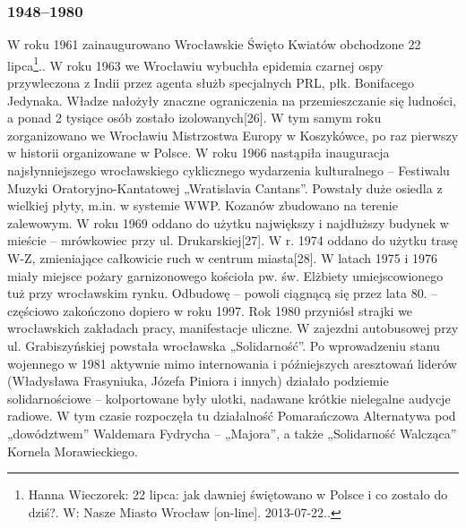 \documentclass{article}
\begin{document}
\subsubsection{1948–1980}
\vspace{3mm} %
\newline W roku 1961 zainaugurowano Wrocławskie Święto Kwiatów obchodzone 22 lipca\footnote{Hanna Wieczorek: 22 lipca: jak dawniej świętowano w Polsce i co zostało do dziś?. W: Nasze Miasto Wrocław [on-line]. 2013-07-22..}..
\vspace{3mm} %
\newline W roku 1963 we Wrocławiu wybuchła epidemia czarnej ospy przywleczona z Indii przez agenta służb specjalnych PRL, płk. Bonifacego Jedynaka. Władze nałożyły znaczne ograniczenia na przemieszczanie się ludności, a ponad 2 tysiące osób zostało izolowanych[26].
\vspace{3mm} %
\newline W tym samym roku zorganizowano we Wrocławiu Mistrzostwa Europy w Koszykówce, po raz pierwszy w historii organizowane w Polsce.
\vspace{3mm} %
\newline W roku 1966 nastąpiła inauguracja najsłynniejszego wrocławskiego cyklicznego wydarzenia kulturalnego – Festiwalu Muzyki Oratoryjno-Kantatowej „Wratislavia Cantans”.
\vspace{3mm} %
\newline Powstały duże osiedla z wielkiej płyty, m.in. w systemie WWP. Kozanów zbudowano na terenie zalewowym. W roku 1969 oddano do użytku największy i najdłuższy budynek w mieście – mrówkowiec przy ul. Drukarskiej[27].
\vspace{3mm} %
\newline W r. 1974 oddano do użytku trasę W-Z, zmieniające całkowicie ruch w centrum miasta[28].
\vspace{3mm} %
\newline W latach 1975 i 1976 miały miejsce pożary garnizonowego kościoła pw. św. Elżbiety umiejscowionego tuż przy wrocławskim rynku. Odbudowę – powoli ciągnącą się przez lata 80. – częściowo zakończono dopiero w roku 1997.
\vspace{3mm} %
\newline Rok 1980 przyniósł strajki we wrocławskich zakładach pracy, manifestacje uliczne. W zajezdni autobusowej przy ul. Grabiszyńskiej powstała wrocławska „Solidarność”. Po wprowadzeniu stanu wojennego w 1981 aktywnie mimo internowania i późniejszych aresztowań liderów (Władysława Frasyniuka, Józefa Piniora i innych) działało podziemie solidarnościowe – kolportowane były ulotki, nadawane krótkie nielegalne audycje radiowe. W tym czasie rozpoczęła tu działalność Pomarańczowa Alternatywa pod „dowództwem” Waldemara Fydrycha – „Majora”, a także „Solidarność Walcząca” Kornela Morawieckiego.
\end{document}
